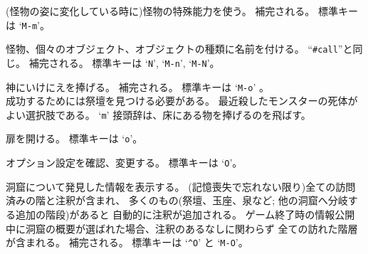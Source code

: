 \item[\tb{\#monster}]
(怪物の姿に変化している時に)怪物の特殊能力を使う。
補完される。
標準キーは `{\tt M-m}'。
\item[\tb{\#name}]
怪物、個々のオブジェクト、オブジェクトの種類に名前を付ける。
``{\tt \#call}''と同じ。
補完される。
標準キーは `{\tt N}', `{\tt M-n}', `{\tt M-N}'。
\item[\tb{\#offer}]
神にいけにえを捧げる。
補完される。
標準キーは `{\tt M-o}' 。\\
成功するためには祭壇を見つける必要がある。
最近殺したモンスターの死体がよい選択肢である。
`{\tt m}' 接頭辞は、床にある物を捧げるのを飛ばす。\\
\item[\tb{\#open}]
扉を開ける。
標準キーは `{\tt o}'。
\item[\tb{\#options}]
オプション設定を確認、変更する。
標準キーは `{\tt O}'。
\item[\tb{\#overview}]
洞窟について発見した情報を表示する。
(記憶喪失で忘れない限り)全ての訪問済みの階と注釈が含まれ、
多くのもの(祭壇、玉座、泉など; 他の洞窟へ分岐する追加の階段)があると
自動的に注釈が追加される。
ゲーム終了時の情報公開中に洞窟の概要が選ばれた場合、注釈のあるなしに関わらず
全ての訪れた階層が含まれる。
補完される。
標準キーは `{\tt \^{}O}' と `{\tt M-O}'。
